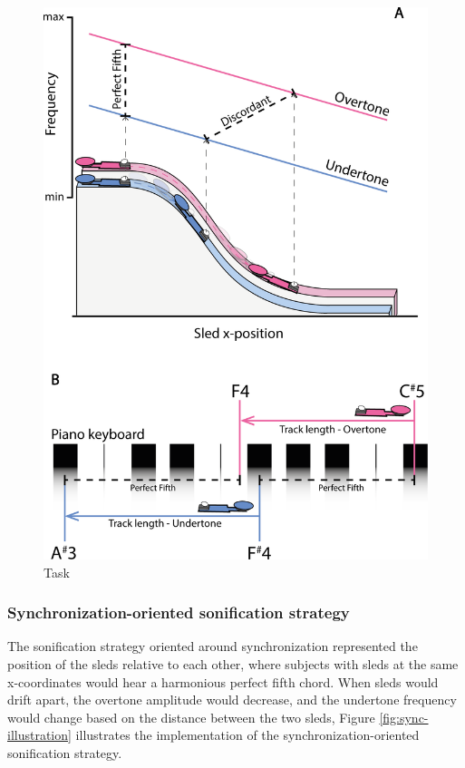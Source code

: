 \documentclass[10pt,a4paper,onecolumn]{article}
\begin{document}
\begin{figure}

{\centering \includegraphics[width=1\linewidth]{figures/task_sonif_illustration} 

}

\caption{Task}\label{fig:task-illustration}
\end{figure}

\hypertarget{synchronization-oriented-sonification-strategy}{%
\subsubsection{Synchronization-oriented sonification strategy}\label{synchronization-oriented-sonification-strategy}}

The sonification strategy oriented around synchronization represented the position of the sleds relative to each other, where subjects with sleds at the same x-coordinates would hear a harmonious perfect fifth chord. When sleds would drift apart, the overtone amplitude would decrease, and the undertone frequency would change based on the distance between the two sleds, Figure \ref{fig:sync-illustration} illustrates the implementation of the synchronization-oriented sonification strategy.
\end{document}

